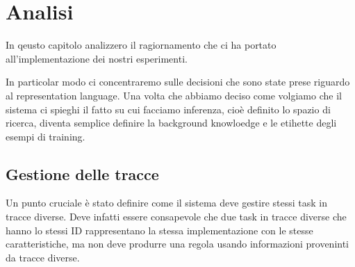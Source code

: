 \chapter{Analisi}
\label{cap:analisi}
In qeusto capitolo analizzero il ragiornamento che ci ha portato all'implementazione dei nostri esperimenti.

In particolar modo ci concentraremo sulle decisioni che sono state prese riguardo al representation language. Una volta che abbiamo deciso come volgiamo che il sistema ci spieghi il fatto su cui facciamo inferenza, cioè definito lo spazio di ricerca, diventa semplice definire la background knowloedge e le etihette degli esempi di training.

\section{Gestione delle tracce}
Un punto cruciale è stato definire come il sistema deve gestire stessi task in tracce diverse. Deve infatti essere consapevole che due task in tracce diverse che hanno lo stessi ID rappresentano la stessa implementazione con le stesse caratteristiche, ma non deve produrre una regola usando informazioni proveninti da tracce diverse.

